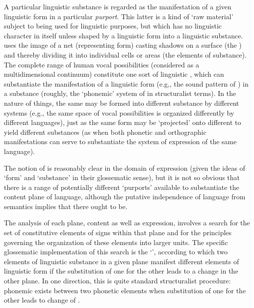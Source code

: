 A particular linguistic substance is regarded as the manifestation of
a given linguistic form in a particular \emph{purport}. This latter is
a kind of `raw material' subject to being used for linguistic
purposes, but which has no linguistic character in itself unless
shaped by a linguistic form into a linguistic substance. {\Hjelmslev}
uses the image of a net (representing form) casting shadows on a
surface (the ) and thereby dividing it into individual cells or
areas (the elements of substance). The complete range of human vocal
possibilities (considered as a multidimensional continuum) constitute
one sort of linguistic , which can substantiate the
manifestation of a linguistic form (e.g,, the sound pattern of
) in a substance (roughly, the `phonemic' system of  in
structuralist terms). In the nature of things, the same  may be
formed into different substance by different systems (e.g., the same
space of vocal possibilities is organized differently by different
languages), just as the same form may be `projected' onto different
 to yield different substances (as when both phonetic and
orthographic manifestations can serve to substantiate the system of
expression of the same language).

The notion of  is reasonably clear in the domain of expression
(given the ideas of `form' and `substance' in their glossematic
sense), but it is not so obvious that there is a range of potentially
different `purports' available to substantiate the content plane of
language, although the putative independence of language from
semantics implies that there ought to be.

The analysis of each plane, content as well as expression, involves a
search for the set of constitutive elements of signs within that plane
and for the principles governing the organization of these elements
into larger units. The specific glossematic implementation of this
search is the `', according to which two elements of
linguistic substance in a given plane manifest different elements of
linguistic form if the substitution of one for the other leads to a
change in the other plane. In one direction, this is quite standard
structuralist procedure: phonemic  exists between two phonetic
elements when substitution of one for the other leads to change of
.

